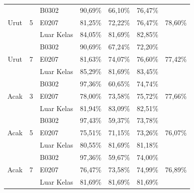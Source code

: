\begin{enumerate}
\begin{table}[H]
\begin{tabular}{|c|c|l|c|c|c|c|}
\multirow{3}{*}{Urut} & \multirow{3}{*}{5} & B0302                            & 90,69\%   & 66,10\% & 76,47\%   & \multirow{3}{*}{78,60\%} \\ \cline{3-6}
                      &                    & E0207                            & 81,25\%   & 72,22\% & 76,47\%   &                          \\ \cline{3-6}
                      &                    & Luar Kelas                       & 84,05\%   & 81,69\% & 82,85\%   &                          \\ \hline
\multirow{3}{*}{Urut} & \multirow{3}{*}{7} & B0302                            & 90,69\%   & 67,24\% & 72,20\%   & \multirow{3}{*}{77,42\%} \\ \cline{3-6}
                      &                    & E0207                            & 81,63\%   & 74,07\% & 76,60\%   &                          \\ \cline{3-6}
                      &                    & Luar Kelas                       & 85,29\%   & 81,69\% & 83,45\%   &                          \\ \hline
\multirow{3}{*}{Acak} & \multirow{3}{*}{3} & B0302                            & 97,36\%   & 60,65\% & 74,74\%   & \multirow{3}{*}{77,66\%} \\ \cline{3-6}
                      &                    & E0207                            & 78,00\%   & 73,58\% & 75,72\%   &                          \\ \cline{3-6}
                      &                    & Luar Kelas                       & 81,94\%   & 83,09\% & 82,51\%   &                          \\ \hline
\multirow{3}{*}{Acak} & \multirow{3}{*}{5} & B0302                            & 97,43\%   & 59,37\% & 73,78\%   & \multirow{3}{*}{76,07\%} \\ \cline{3-6}
                      &                    & E0207                            & 75,51\%   & 71,15\% & 73,26\%   &                          \\ \cline{3-6}
                      &                    & Luar Kelas                       & 80,55\%   & 81,69\% & 81,18\%   &                          \\ \hline
\multirow{3}{*}{Acak} & \multirow{3}{*}{7} & B0302                            & 97,36\%   & 59,67\% & 74,00\%    & \multirow{3}{*}{76,89\%} \\ \cline{3-6}
                      &                    & E0207                            & 76,47\%   & 73,58\% & 74,99\%   &                          \\ \cline{3-6}
                      &                    & Luar Kelas                       & 81,69\%   & 81,69\% & 81,69\%   &                          \\ \hline
\end{tabular}
\end{table}



\end{enumerate}

